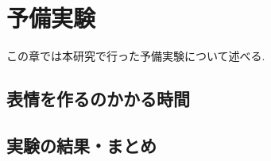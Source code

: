 \chapter{予備実験}
\label{chap:pre_experiment}

この章では本研究で行った予備実験について述べる.

\section{表情を作るのかかる時間}
\section{実験の結果・まとめ}
